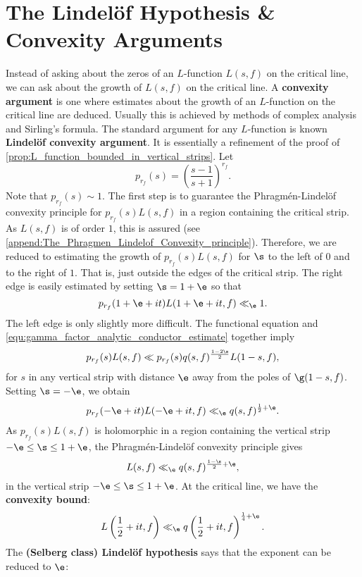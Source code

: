   \section{The Lindel\"of Hypothesis \& Convexity Arguments}
    Instead of asking about the zeros of an $L$-function $L(s,f)$ on the critical line, we can ask about the growth of $L(s,f)$ on the critical line. A \textbf{convexity argument} is one where estimates about the growth of an $L$-function on the critical line are deduced. Usually this is achieved by methods of complex analysis and Sirling's formula. The standard argument for any $L$-function is known \textbf{Lindel\"of convexity argument}. It is essentially a refinement of the proof of \cref{prop:L_function_bounded_in_vertical_strips}. Let
    \[
      p_{r_{f}}(s) = \left(\frac{s-1}{s+1}\right)^{r_{f}}.
    \]
    Note that $p_{r_{f}}(s) \sim 1$. The first step is to guarantee the Phragm\'en-Lindel\"of convexity principle for $p_{r_{f}}(s)L(s,f)$ in a region containing the critical strip. As $L(s,f)$ is of order $1$, this is assured (see \cref{append:The_Phragmen_Lindelof_Convexity_principle}). Therefore, we are reduced to estimating the growth of $p_{r_{f}}(s)L(s,f)$ for $\s$ to the left of $0$ and to the right of $1$. That is, just outside the edges of the critical strip. The right edge is easily estimated by setting $\s = 1+\e$ so that
    \[
      p_{r_{f}}(1+\e+it)L(1+\e+it,f) \ll_{\e} 1.
    \]
    The left edge is only slightly more difficult. The functional equation and \cref{equ:gamma_factor_analytic_conductor_estimate} together imply
    \[
      p_{r_{f}}(s)L(s,f) \ll p_{r_{f}}(s)q(s,f)^{\frac{1-2\s}{2}}L(1-s,f),
    \]
    for $s$ in any vertical strip with distance $\e$ away from the poles of $\g(1-s,f)$. Setting $\s = -\e$, we obtain
    \[
      p_{r_{f}}(-\e+it)L(-\e+it,f) \ll_{\e} q(s,f)^{\frac{1}{2}+\e}.
    \]
    As $p_{r_{f}}(s)L(s,f)$ is holomorphic in a region containing the vertical strip $-\e \le \s \le 1+\e$, the Phragm\'en-Lindel\"of convexity principle gives
    \[
      L(s,f) \ll_{\e} q(s,f)^{\frac{1-\s}{2}+\e},
    \]
    in the vertical strip $-\e \le \s \le 1+\e$. At the critical line, we have the \textbf{convexity bound}:
    \begin{equation}\label{equ:convexity_bound_L_function}
      L\left(\frac{1}{2}+it,f\right) \ll_{\e} q\left(\frac{1}{2}+it,f\right)^{\frac{1}{4}+\e}.
    \end{equation}
    The \textbf{(Selberg class) Lindel\"of hypothesis} says that the exponent can be reduced to $\e$:

